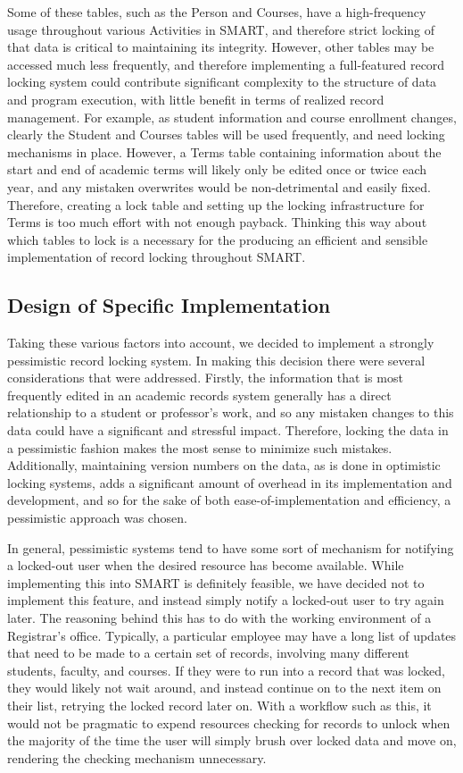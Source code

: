 \documentclass[12pt]{article}
\begin{document}
Some of these tables, such as the Person and Courses, have a high-frequency usage throughout various Activities in SMART, and therefore strict locking of that data is critical to maintaining its integrity. However, other tables may be accessed much less frequently, and therefore implementing a full-featured record locking system could contribute significant complexity to the structure of data and program execution, with little benefit in terms of realized record management. For example, as student information and course enrollment changes, clearly the Student and Courses tables will be used frequently, and need locking mechanisms in place. However, a Terms table containing information about the start and end of academic terms will likely only be edited once or twice each year, and any mistaken overwrites would be non-detrimental and easily fixed. Therefore, creating a lock table and setting up the locking infrastructure for Terms is too much effort with not enough payback. Thinking this way about which tables to lock is a necessary for the producing an efficient and sensible implementation of record locking throughout SMART.

\subsection{Design of Specific Implementation}

Taking these various factors into account, we decided to implement a strongly pessimistic record locking system. In making this decision there were several considerations that were addressed. Firstly, the information that is most frequently edited in an academic records system generally has a direct relationship to a student or professor's work, and so any mistaken changes to this data could have a significant and stressful impact. Therefore, locking the data in a pessimistic fashion makes the most sense to minimize such mistakes. Additionally, maintaining version numbers on the data, as is done in optimistic locking systems, adds a significant amount of overhead in its implementation and development, and so for the sake of both ease-of-implementation and efficiency, a pessimistic approach was chosen.

In general, pessimistic systems tend to have some sort of mechanism for notifying a locked-out user when the desired resource has become available. While implementing this into SMART is definitely feasible, we have decided not to implement this feature, and instead simply notify a locked-out user to try again later. The reasoning behind this has to do with the working environment of a Registrar's office. Typically, a particular employee may have a long list of updates that need to be made to a certain set of records, involving many different students, faculty, and courses. If they were to run into a record that was locked, they would likely not wait around, and instead continue on to the next item on their list, retrying the locked record later on. With a workflow such as this, it would not be pragmatic to expend resources checking for records to unlock when the majority of the time the user will simply brush over locked data and move on, rendering the checking mechanism unnecessary.
\end{document}

